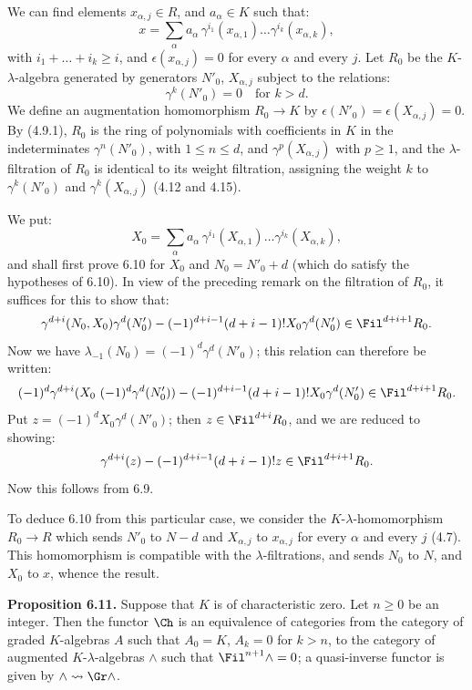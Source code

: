 We can find elements \(x_{\alpha,j}\in R\), and \(a_\alpha\in K\) such that:
\[
  x=\sum_\alpha a_\alpha\,
       \gamma^{i_1}(x_{\alpha,1})\ldots
       \gamma^{i_k}(x_{\alpha,k}),
\]
with \(i_1+\ldots+i_k\ge i\), and \(\epsilon(x_{\alpha,j})=0\) for every \(\alpha\) and every \(j\). Let \(R_0\) be the \(K\)-\(\lambda\)-algebra generated by generators \(N'_0\), \(X_{\alpha,j}\) subject to the relations:
\[
  \gamma^k(N'_0)=0\quad\text{for }k>d.
\]
We define an augmentation homomorphism \(R_0\to K\) by \(\epsilon(N'_0)=\epsilon(X_{\alpha,j})=0\). By (4.9.1), \(R_0\) is the ring of polynomials with coefficients in \(K\) in the indeterminates \(\gamma^n(N'_0)\), with \(1\le n\le d\), and \(\gamma^p(X_{\alpha,j})\) with \(p\ge1\), and the \(\lambda\)-filtration of \(R_0\) is identical to its weight filtration, assigning the weight \(k\) to \(\gamma^k(N'_0)\) and \(\gamma^k(X_{\alpha,j})\) (4.12 and 4.15).

We put:
\[
  X_0=\sum_\alpha a_\alpha\,
       \gamma^{i_1}(X_{\alpha,1})\ldots
       \gamma^{i_k}(X_{\alpha,k}),
\]
%
and shall first prove 6.10 for \(X_0\) and \(N_0=N'_0+d\) (which do satisfy the hypotheses of 6.10). In view of the preceding remark on the filtration of \(R_0\), it suffices for this to show that:
\[
  \gamma^{d+i}(N_0,X_0)\gamma^d(N'_0)
  -
  (-1)^{d+i-1}(d+i-1)!X_0\gamma^d(N'_0)
  \in\Fil^{d+i+1}R_0 .
\]
Now we have \(\lambda_{-1}(N_0)=(-1)^d\gamma^d(N'_0)\); this relation can therefore be written:
\[
  (-1)^d\gamma^{d+i}(X_0\ (-1)^d\gamma^d(N'_0))
  -
  (-1)^{d+i-1}(d+i-1)!X_0\gamma^d(N'_0)
  \in\Fil^{d+i+1}R_0 .
\]
Put \(z=(-1)^dX_0\gamma^d(N'_0)\); then \(z\in\Fil^{d+i}R_0\), and we are reduced to showing:
\[
  \gamma^{d+i}(z)-(-1)^{d+i-1}(d+i-1)!z\in\Fil^{d+i+1}R_0 .
\]
Now this follows from 6.9.

To deduce 6.10 from this particular case, we consider the \(K\)-\(\lambda\)-homomorphism \(R_0\to R\) which sends \(N'_0\) to \(N-d\) and \(X_{\alpha,j}\) to \(x_{\alpha,j}\) for every \(\alpha\) and every \(j\) (4.7). This homomorphism is compatible with the \(\lambda\)-filtrations, and sends \(N_0\) to \(N\), and \(X_0\) to \(x\), whence the result.

\textbf{Proposition 6.11.} Suppose that \(K\) is of characteristic zero. Let \(n\ge0\) be an integer. Then the functor \(\Ch\) is an equivalence of categories from the category of graded \(K\)-algebras \(A\) such that \(A_0=K\), \(A_k=0\) for \(k>n\), to the category of augmented \(K\)-\(\lambda\)-algebras \(\mathord{\wedge}\) such that \(\Fil^{n+1}\mathord{\wedge}=0\); a quasi-inverse functor is given by \(\mathord{\wedge}\rightsquigarrow\Gr\mathord{\wedge}\).


